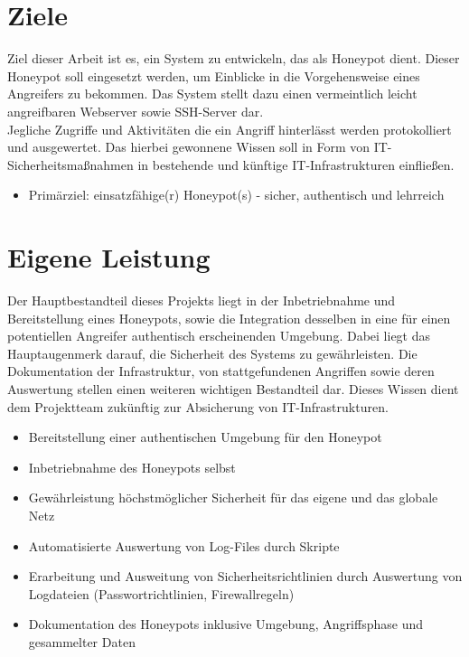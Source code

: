 \newpage


\section{Ziele}
\label{sec:Ziele}

Ziel dieser Arbeit ist es, ein System zu entwickeln, das als Honeypot dient. Dieser Honeypot soll eingesetzt werden, um Einblicke in die Vorgehensweise eines Angreifers zu bekommen. 
Das System stellt dazu einen vermeintlich leicht angreifbaren Webserver sowie SSH-Server dar.\\


Jegliche Zugriffe und Aktivitäten die ein Angriff hinterlässt werden protokolliert und ausgewertet. Das hierbei gewonnene Wissen soll in Form von IT-Sicherheitsmaßnahmen in bestehende und künftige IT-Infrastrukturen einfließen.

\begin{itemize}
\item Primärziel: einsatzfähige(r) Honeypot(s) - sicher, authentisch und lehrreich
\end{itemize}




\section{Eigene Leistung}
\label{sec:Eigene Leistung}

Der Hauptbestandteil dieses Projekts liegt in der Inbetriebnahme und Bereitstellung eines Honeypots, sowie die Integration desselben in eine für einen potentiellen Angreifer authentisch erscheinenden Umgebung. Dabei liegt das Hauptaugenmerk darauf, die Sicherheit des Systems zu gewährleisten. Die Dokumentation der Infrastruktur, von stattgefundenen Angriffen sowie deren Auswertung stellen einen weiteren wichtigen Bestandteil dar. Dieses Wissen dient dem Projektteam zukünftig zur Absicherung von IT-Infrastrukturen.

\begin{itemize}
\item Bereitstellung einer authentischen Umgebung für den Honeypot
\item Inbetriebnahme des Honeypots selbst
\item Gewährleistung höchstmöglicher Sicherheit für das eigene und das globale Netz
\item Automatisierte Auswertung von Log-Files durch Skripte
\item Erarbeitung und Ausweitung von Sicherheitsrichtlinien durch Auswertung von Logdateien (Passwortrichtlinien, Firewallregeln)
\item Dokumentation des Honeypots inklusive Umgebung, Angriffsphase und gesammelter Daten
\end{itemize}

